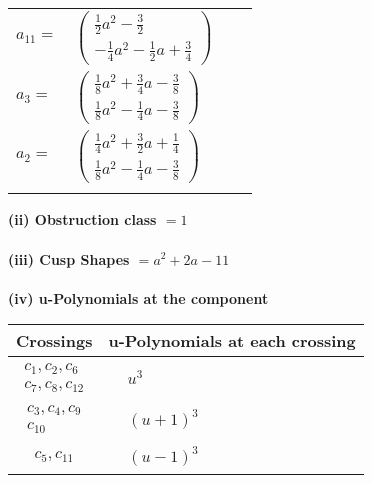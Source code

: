\documentclass[1p]{elsarticle_modified}
\theoremstyle{definition}
\begin{document}
\begin{tabular}{m{7pt} m{180pt} m{7pt} m{180pt} }
\flushright $a_{11}=$&$\begin{pmatrix}\frac{1}{2} a^2-\frac{3}{2}\\-\frac{1}{4} a^2-\frac{1}{2} a+\frac{3}{4}\end{pmatrix}$ \\
\flushright $a_{3}=$&$\begin{pmatrix}\frac{1}{8} a^2+\frac{3}{4} a-\frac{3}{8}\\\frac{1}{8} a^2-\frac{1}{4} a-\frac{3}{8}\end{pmatrix}$ \\
\flushright $a_{2}=$&$\begin{pmatrix}\frac{1}{4} a^2+\frac{3}{2} a+\frac{1}{4}\\\frac{1}{8} a^2-\frac{1}{4} a-\frac{3}{8}\end{pmatrix}$\\&\end{tabular}
\flushleft \textbf{(ii) Obstruction class $= 1$}\\~\\
\flushleft \textbf{(iii) Cusp Shapes $= a^2+2 a-11$}\\~\\
\newpage\renewcommand{\arraystretch}{1}
\flushleft \textbf{(iv) u-Polynomials at the component}\newline \\
\begin{tabular}{m{50pt}|m{274pt}}
Crossings & \hspace{64pt}u-Polynomials at each crossing \\
\hline $$\begin{aligned}c_{1},c_{2},c_{6}\\c_{7},c_{8},c_{12}\end{aligned}$$&$\begin{aligned}
&u^3
\end{aligned}$\\
\hline $$\begin{aligned}c_{3},c_{4},c_{9}\\c_{10}\end{aligned}$$&$\begin{aligned}
&(u+1)^3
\end{aligned}$\\
\hline $$\begin{aligned}c_{5},c_{11}\end{aligned}$$&$\begin{aligned}
&(u-1)^3
\end{aligned}$\\
\hline
\end{tabular}\\~\\
\end{document}
